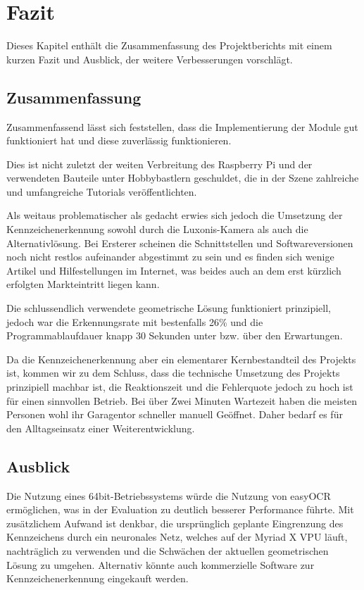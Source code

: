 \chapter{Fazit}

\nocite{*}

Dieses Kapitel enthält die Zusammenfassung des Projektberichts mit einem kurzen Fazit und Ausblick, der weitere Verbesserungen vorschlägt.

\section{Zusammenfassung}
Zusammenfassend lässt sich feststellen, dass die Implementierung der Module gut funktioniert hat und diese zuverlässig funktionieren.

Dies ist nicht zuletzt der weiten Verbreitung des Raspberry Pi und der verwendeten Bauteile unter Hobbybastlern geschuldet, die in der Szene zahlreiche und umfangreiche Tutorials veröffentlichten.

Als weitaus problematischer als gedacht erwies sich jedoch die Umsetzung der Kennzeichenerkennung sowohl durch die Luxonis-Kamera als auch die Alternativlösung. Bei Ersterer scheinen die Schnittstellen und Softwareversionen noch nicht restlos aufeinander abgestimmt zu sein und es finden sich wenige Artikel und Hilfestellungen im Internet, was beides auch an dem erst kürzlich erfolgten Markteintritt liegen kann.

Die schlussendlich verwendete geometrische Lösung funktioniert prinzipiell, jedoch war die Erkennungsrate mit bestenfalls 26\% und die Programmablaufdauer knapp 30 Sekunden unter bzw. über den Erwartungen. 

Da die Kennzeichenerkennung aber ein elementarer Kernbestandteil des Projekts ist, kommen wir zu dem Schluss, dass die technische Umsetzung des Projekts prinzipiell machbar ist, die Reaktionszeit und die Fehlerquote jedoch zu hoch ist für einen sinnvollen Betrieb. Bei über Zwei Minuten Wartezeit haben die meisten Personen wohl ihr Garagentor schneller manuell Geöffnet. Daher bedarf es für den Alltagseinsatz einer Weiterentwicklung.

\section{Ausblick}
Die Nutzung eines 64bit-Betriebssystems würde die Nutzung von easyOCR ermöglichen, was in der Evaluation zu deutlich besserer Performance führte.
Mit zusätzlichem Aufwand ist denkbar, die ursprünglich geplante Eingrenzung des Kennzeichens durch ein neuronales Netz, welches auf der Myriad X VPU läuft, nachträglich zu verwenden und die Schwächen der aktuellen geometrischen Lösung zu umgehen. Alternativ könnte auch kommerzielle Software zur Kennzeichenerkennung eingekauft werden.

